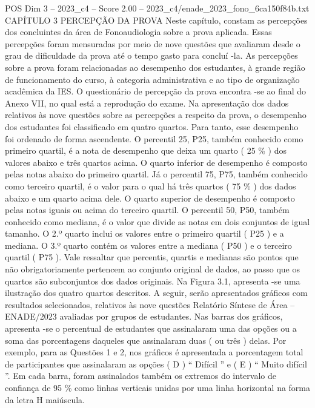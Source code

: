 \begin{textsample}{POS Dim 3 – 2023\_c4 – Score 2.00 – 2023\_c4/enade\_2023\_fono\_6ca150f84b.txt}  \label{ex:f3_pos_095}
CAPÍTULO 3 PERCEPÇÃO DA PROVA Neste capítulo, constam as percepções dos concluintes da área de Fonoaudiologia sobre a prova aplicada.
Essas percepções foram mensuradas por meio de nove questões que avaliaram desde o grau de dificuldade da prova até o tempo gasto para concluí -la.
As percepções sobre a prova foram relacionadas ao desempenho dos estudantes, à grande região de funcionamento do curso, à categoria administrativa e ao tipo de organização acadêmica da IES.
O questionário de percepção da prova encontra -se ao final do Anexo VII, no qual está a reprodução do exame.
Na apresentação dos dados relativos às nove questões sobre as percepções a respeito da prova, o desempenho dos estudantes foi classificado em quatro quartos.
Para tanto, esse desempenho foi ordenado de forma ascendente.
O percentil 25, P25, também conhecido como primeiro quartil, é a nota de desempenho que deixa um quarto ( 25 \% ) dos valores abaixo e três quartos acima.
O quarto inferior de desempenho é composto pelas notas abaixo do primeiro quartil.
Já o percentil 75, P75, também conhecido como terceiro quartil, é o valor para o qual há três quartos ( 75 \% ) dos dados abaixo e um quarto acima dele.
O quarto superior de desempenho é composto pelas notas iguais ou acima do terceiro quartil.
O percentil 50, P50, também conhecido como mediana, é o valor que divide as notas em dois conjuntos de igual tamanho.
O 2.º quarto inclui os valores entre o primeiro quartil ( P25 ) e a mediana.
O 3.º quarto contém os valores entre a mediana ( P50 ) e o terceiro quartil ( P75 ).
Vale ressaltar que percentis, quartis e medianas são pontos que não obrigatoriamente pertencem ao conjunto original de dados, ao passo que os quartos são subconjuntos dos dados originais.
Na Figura 3.1, apresenta -se uma ilustração dos quatro quartos descritos.
A seguir, serão apresentados gráficos com resultados selecionados, relativos às nove questões Relatório Síntese de Área – ENADE/2023 avaliadas por grupos de estudantes.
Nas barras dos gráficos, apresenta -se o percentual de estudantes que assinalaram uma das opções ou a soma das porcentagens daqueles que assinalaram duas ( ou três ) delas.
Por exemplo, para as Questões 1 e 2, nos gráficos é apresentada a porcentagem total de participantes que assinalaram as opções ( D ) “ Difícil ” e ( E ) “ Muito difícil ”.
Em cada barra, foram assinalados também os extremos do intervalo de confiança de 95 \% como linhas verticais unidas por uma linha horizontal na forma da letra H maiúscula.

\end{textsample}
